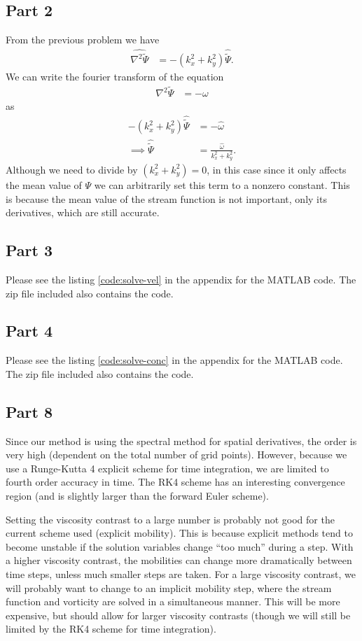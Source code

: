 \documentclass{article}
\begin{document}
\subsection{Part 2}
From the previous problem we have
\begin{align}
    \widehat{\nabla^2 \tilde{\Psi}} &= -(k^2_x + k^2_y) \hat{\tilde{\Psi}}.
\end{align}
We can write the fourier transform of the equation
\begin{align}
    \nabla^2 \tilde{\Psi} &= -\omega
\end{align}
as
\begin{align}
    -(k^2_x + k^2_y) \hat{\tilde{\Psi}} &= -\hat{\omega} \\
\implies \hat{\tilde{\Psi}} &= \frac{\hat{\omega}}{k^2_x + k^2_y}.
\end{align}
Although we need to divide by $(k^2_x + k^2_y) = 0$, in this case since it only affects the mean value of $\Psi$ we can arbitrarily set this term to a nonzero constant.
This is because the mean value of the stream function is not important, only its derivatives, which are still accurate.

\subsection{Part 3}
Please see the listing \ref{code:solve-vel} in the appendix for the MATLAB code.
The zip file included also contains the code.

\subsection{Part 4}
Please see the listing \ref{code:solve-conc} in the appendix for the MATLAB code.
The zip file included also contains the code.

\subsection{Part 8}
Since our method is using the spectral method for spatial derivatives, the order is very high (dependent on the total number of grid points).
However, because we use a Runge-Kutta 4 explicit scheme for time integration, we are limited to fourth order accuracy in time.
The RK4 scheme has an interesting convergence region (and is slightly larger than the forward Euler scheme).

Setting the viscosity contrast to a large number is probably not good for the current scheme used (explicit mobility).
This is because explicit methods tend to become unstable if the solution variables change ``too much'' during a step.
With a higher viscosity contrast, the mobilities can change more dramatically between time steps, unless much smaller steps are taken.
For a large viscosity contrast, we will probably want to change to an implicit mobility step, where the stream function and vorticity are solved in a simultaneous manner.
This will be more expensive, but should allow for larger viscosity contrasts (though we will still be limited by the RK4 scheme for time integration).
\end{document}
